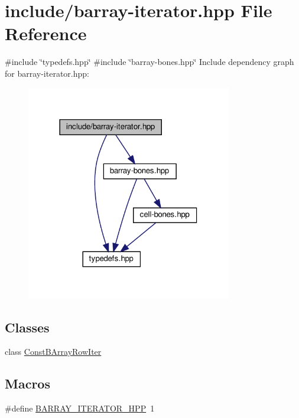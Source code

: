 \hypertarget{barray-iterator_8hpp}{}\section{include/barray-\/iterator.hpp File Reference}
\label{barray-iterator_8hpp}
{\ttfamily \#include \char`\"{}typedefs.\+hpp\char`\"{}}\newline
{\ttfamily \#include \char`\"{}barray-\/bones.\+hpp\char`\"{}}\newline
Include dependency graph for barray-\/iterator.hpp\+:\nopagebreak
\begin{figure}[H]
\begin{center}
\leavevmode
\includegraphics[width=254pt]{barray-iterator_8hpp__incl}
\end{center}
\end{figure}
\subsection*{Classes}
\begin{DoxyCompactItemize}
\item 
class \hyperlink{class_const_b_array_row_iter}{Const\+B\+Array\+Row\+Iter}
\end{DoxyCompactItemize}
\subsection*{Macros}
\begin{DoxyCompactItemize}
\item 
\#define \hyperlink{barray-iterator_8hpp_af7d28058e98dd1797def3cd230abe121}{B\+A\+R\+R\+A\+Y\+\_\+\+I\+T\+E\+R\+A\+T\+O\+R\+\_\+\+H\+PP}~1
\end{DoxyCompactItemize}



